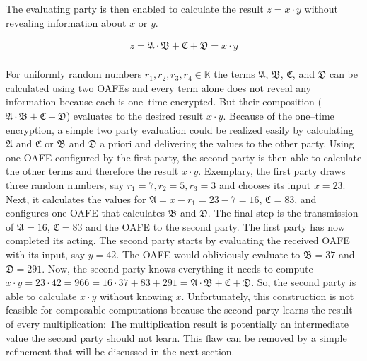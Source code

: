 \noindent{}The evaluating party is then enabled to calculate the result $z = x
\cdot y$ without revealing information about $x$ or $y$.

\begin{align*}
  z = \mathfrak{A} \cdot \mathfrak{B} + \mathfrak{C} + \mathfrak{D} =
  x \cdot y\\
\end{align*}

\noindent{}For uniformly random numbers $r_1, r_2, r_3, r_4 \in \mathbb{K}$ the
terms $\mathfrak{A}$, $\mathfrak{B}$, $\mathfrak{C}$, and $\mathfrak{D}$ can be
calculated using two OAFEs and every term alone does not reveal any information
because each is one--time encrypted. But their composition ($\mathfrak{A} \cdot
\mathfrak{B} + \mathfrak{C} + \mathfrak{D}$) evaluates to the desired result $x
\cdot y$. Because of the one--time encryption, a simple two party evaluation
could be realized easily by calculating $\mathfrak{A}$ and $\mathfrak{C}$ or
$\mathfrak{B}$ and $\mathfrak{D}$ a priori and delivering the values to the
other party. Using one OAFE configured by the first party, the second party is
then able to calculate the other terms and therefore the result $x \cdot y$.
Exemplary, the first party draws three random numbers, say $r_1=7, r_2=5, r_3=3$
and chooses its input $x=23$. Next, it calculates the values for $\mathfrak{A} =
x - r_1 = 23 - 7 = 16$, $\mathfrak{C} = 83$, and configures one OAFE that
calculates $\mathfrak{B}$ and $\mathfrak{D}$. The final step is the transmission
of $\mathfrak{A} = 16$, $\mathfrak{C} = 83$ and the OAFE to the second party.
The first party has now completed its acting. The second party starts by
evaluating the received OAFE with its input, say $y = 42$. The OAFE would
obliviously evaluate to $\mathfrak{B} = 37$ and $\mathfrak{D} = 291$. Now, the
second party knows everything it needs to compute $x \cdot y = 23 \cdot 42 = 966
= 16 \cdot 37 + 83 + 291 = \mathfrak{A} \cdot \mathfrak{B} + \mathfrak{C} +
\mathfrak{D}$. So, the second party is able to calculate $x \cdot y$ without
knowing $x$.  Unfortunately, this construction is not feasible for composable
computations because the second party learns the result of every multiplication:
The multiplication result is potentially an intermediate value the second
party should not learn. This flaw can be removed by a simple refinement that
will be discussed in the next section.



